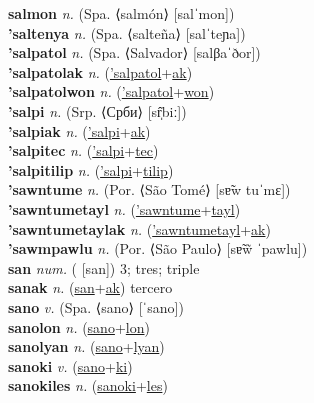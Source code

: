 \textbf{salmon} \textit{n.} (Spa. ⟨salmón⟩ [salˈmon])
 \label{salmon} \\
\textbf{'saltenya} \textit{n.} (Spa. ⟨salteña⟩ [salˈteɲa])
 \label{'saltenya} \\
\textbf{'salpatol} \textit{n.} (Spa. ⟨Salvador⟩ [salβaˈðor])
 \label{'salpatol} \\
\textbf{'salpatolak} \textit{n.} (\hyperref['salpatol]{'salpatol}+\hyperref[ak]{ak})
 \label{'salpatolak} \\
\textbf{'salpatolwon} \textit{n.} (\hyperref['salpatol]{'salpatol}+\hyperref[won]{won})
 \label{'salpatolwon} \\
\textbf{'salpi} \textit{n.} (Srp. ⟨Срби⟩ [sr̩̂biː])
 \label{'salpi} \\
\textbf{'salpiak} \textit{n.} (\hyperref['salpi]{'salpi}+\hyperref[ak]{ak})
 \label{'salpiak} \\
\textbf{'salpitec} \textit{n.} (\hyperref['salpi]{'salpi}+\hyperref[tec]{tec})
 \label{'salpitec} \\
\textbf{'salpitilip} \textit{n.} (\hyperref['salpi]{'salpi}+\hyperref[tilip]{tilip})
 \label{'salpitilip} \\
\textbf{'sawntume} \textit{n.} (Por. ⟨São Tomé⟩ [sɐ̃w tuˈmɛ])
 \label{'sawntume} \\
\textbf{'sawntumetayl} \textit{n.} (\hyperref['sawntume]{'sawntume}+\hyperref[tayl]{tayl})
 \label{'sawntumetayl} \\
\textbf{'sawntumetaylak} \textit{n.} (\hyperref['sawntumetayl]{'sawntumetayl}+\hyperref[ak]{ak})
 \label{'sawntumetaylak} \\
\textbf{'sawmpawlu} \textit{n.} (Por. ⟨São Paulo⟩ [sɐ̃w̃ ˈpawlu])
 \label{'sawmpawlu} \\
\textbf{san} \textit{num.} ( [san])
3; tres; triple \label{san} \\
\textbf{sanak} \textit{n.} (\hyperref[san]{san}+\hyperref[ak]{ak})
tercero \label{sanak} \\
\textbf{sano} \textit{v.} (Spa. ⟨sano⟩ [ˈsano])
 \label{sano} \\
\textbf{sanolon} \textit{n.} (\hyperref[sano]{sano}+\hyperref[lon]{lon})
 \label{sanolon} \\
\textbf{sanolyan} \textit{n.} (\hyperref[sano]{sano}+\hyperref[lyan]{lyan})
 \label{sanolyan} \\
\textbf{sanoki} \textit{v.} (\hyperref[sano]{sano}+\hyperref[ki]{ki})
 \label{sanoki} \\
\textbf{sanokiles} \textit{n.} (\hyperref[sanoki]{sanoki}+\hyperref[les]{les})
